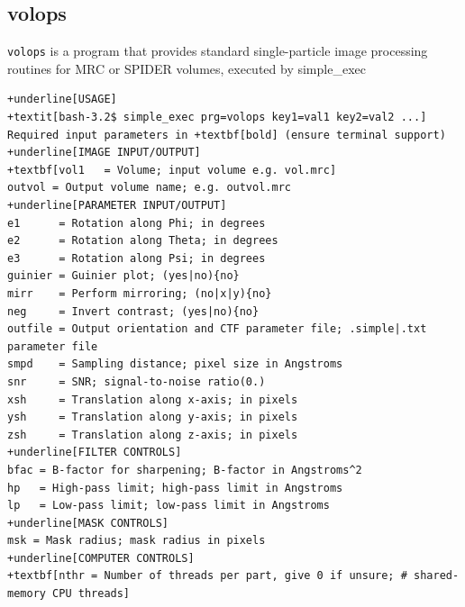 \documentclass[a4paper,11pt]{article}
\newcommand{\prgname}[1]{\textcolor{NavyBlue}{\texttt{#1}}}
\begin{document}
\subsection{volops}
\label{volops}
\prgname{volops} is a program that provides standard single-particle image processing routines for MRC or SPIDER volumes, executed by simple\_exec
\begin{Verbatim}[commandchars=+\[\],fontsize=\small,breaklines=true]
+underline[USAGE]
+textit[bash-3.2$ simple_exec prg=volops key1=val1 key2=val2 ...]
Required input parameters in +textbf[bold] (ensure terminal support)
+underline[IMAGE INPUT/OUTPUT]
+textbf[vol1   = Volume; input volume e.g. vol.mrc]
outvol = Output volume name; e.g. outvol.mrc
+underline[PARAMETER INPUT/OUTPUT]
e1      = Rotation along Phi; in degrees
e2      = Rotation along Theta; in degrees
e3      = Rotation along Psi; in degrees
guinier = Guinier plot; (yes|no){no}
mirr    = Perform mirroring; (no|x|y){no}
neg     = Invert contrast; (yes|no){no}
outfile = Output orientation and CTF parameter file; .simple|.txt parameter file
smpd    = Sampling distance; pixel size in Angstroms
snr     = SNR; signal-to-noise ratio(0.)
xsh     = Translation along x-axis; in pixels
ysh     = Translation along y-axis; in pixels
zsh     = Translation along z-axis; in pixels
+underline[FILTER CONTROLS]
bfac = B-factor for sharpening; B-factor in Angstroms^2
hp   = High-pass limit; high-pass limit in Angstroms
lp   = Low-pass limit; low-pass limit in Angstroms
+underline[MASK CONTROLS]
msk = Mask radius; mask radius in pixels
+underline[COMPUTER CONTROLS]
+textbf[nthr = Number of threads per part, give 0 if unsure; # shared-memory CPU threads]
\end{Verbatim}
\end{document}
